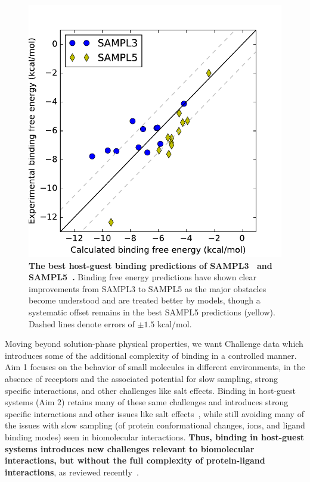 \documentclass[11pt]{article}
\begin{document}
\begin{figure}
\vspace{-0.23in}
\begin{centering}
\includegraphics[width=\textwidth]{figures/sampl3_and_sampl5.pdf}

\end{centering}
\footnotesize
\caption{\label{figure:hg_sampl}  
\textbf{The best host-guest binding predictions of SAMPL3~\cite{muddana_sampl3_2012} and SAMPL5~\cite{yin_sampl5_2016}.} 
Binding free energy predictions have shown clear improvements from SAMPL3 to SAMPL5 as the major obstacles become understood and are treated better by models, though a systematic offset remains in the best SAMPL5 predictions (yellow). Dashed lines denote errors of $\pm1.5$ kcal/mol.
}
\end{figure}

Moving beyond solution-phase physical properties, we want Challenge data which introduces some of the additional complexity of binding in a controlled manner.  
Aim 1 focuses on the behavior of small molecules in different environments, in the absence of receptors and the associated potential for slow sampling, strong specific interactions, and other challenges like salt effects.
Binding in host-guest systems (Aim 2) retains many of these same challenges and introduces strong specific interactions and other issues like salt effects~\cite{Mobley:2017:AnnualReviewofBiophysics}, while still avoiding many of the issues with slow sampling (of protein conformational changes, ions, and ligand binding modes) seen in biomolecular interactions.
\textbf{Thus, binding in host-guest systems introduces new challenges relevant to biomolecular interactions, but without the full complexity of protein-ligand interactions}, as reviewed recently~\cite{Mobley:2017:AnnualReviewofBiophysics}.
\end{document}
